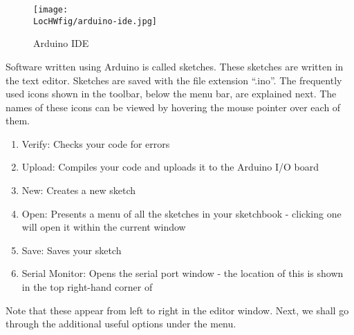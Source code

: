 \begin{figure}
      \centering
      \texttt{[image: \\LocHWfig/arduino-ide.jpg]}
      \caption{Arduino IDE}
      \label{ard-ide}
\end{figure}
Software written using Arduino is called sketches. These sketches are
written in the text editor. Sketches are saved with the file extension
``.ino''. The frequently used icons shown in the toolbar, below the menu bar, are explained next. The names of these icons can be viewed by hovering the mouse pointer over each of them.

\begin{enumerate}
      \item Verify: Checks your code for errors
      \item Upload: Compiles your code and uploads it to the Arduino I/O
            board
      \item New: Creates a new sketch
      \item Open: Presents a menu of all the sketches in your
            sketchbook - clicking one will open it within the current window
      \item Save: Saves your sketch
      \item Serial Monitor: Opens the serial port window - the location of
            this is shown in the top right-hand corner of 
\end{enumerate}
Note that these appear from left to right in the editor window. Next, we shall go through the additional useful options under the menu.
